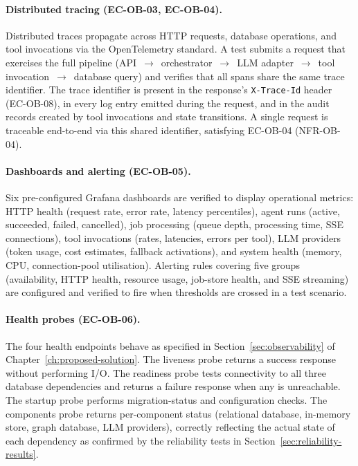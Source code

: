 \documentclass[a4paper]{sapthesis}
\begin{document}
\paragraph{Distributed tracing (EC-OB-03, EC-OB-04).}
Distributed traces propagate across HTTP requests, database operations,
and tool invocations via the OpenTelemetry standard.  A test submits a
request that exercises the full pipeline (API~$\to$~orchestrator~$\to$~LLM
adapter~$\to$~tool invocation~$\to$~database query) and verifies that all
spans share the same trace identifier.  The trace identifier is present
in the response's \texttt{X-Trace-Id} header (EC-OB-08), in every log
entry emitted during the request, and in the audit records created by
tool invocations and state transitions.  A single request is traceable
end-to-end via this shared identifier, satisfying EC-OB-04 (NFR-OB-04).

\paragraph{Dashboards and alerting (EC-OB-05).}
Six pre-configured Grafana dashboards are verified to display operational
metrics: HTTP health (request rate, error rate, latency percentiles),
agent runs (active, succeeded, failed, cancelled), job processing
(queue depth, processing time, SSE connections), tool invocations
(rates, latencies, errors per tool), LLM providers (token usage, cost
estimates, fallback activations), and system health (memory, CPU,
connection-pool utilisation).  Alerting rules covering five groups
(availability, HTTP health, resource usage, job-store health, and SSE
streaming) are configured and verified to fire when thresholds are
crossed in a test scenario.

\paragraph{Health probes (EC-OB-06).}
The four health endpoints behave as specified in
Section~\ref{sec:observability} of Chapter~\ref{ch:proposed-solution}.
The liveness probe returns a success response without performing I/O.
The readiness probe tests connectivity to all three database dependencies
and returns a failure response when any is unreachable.  The startup
probe performs migration-status and configuration checks.  The components
probe returns per-component status (relational database, in-memory store,
graph database, LLM providers), correctly reflecting the actual state of
each dependency as confirmed by the reliability tests in
Section~\ref{sec:reliability-results}.
\end{document}
